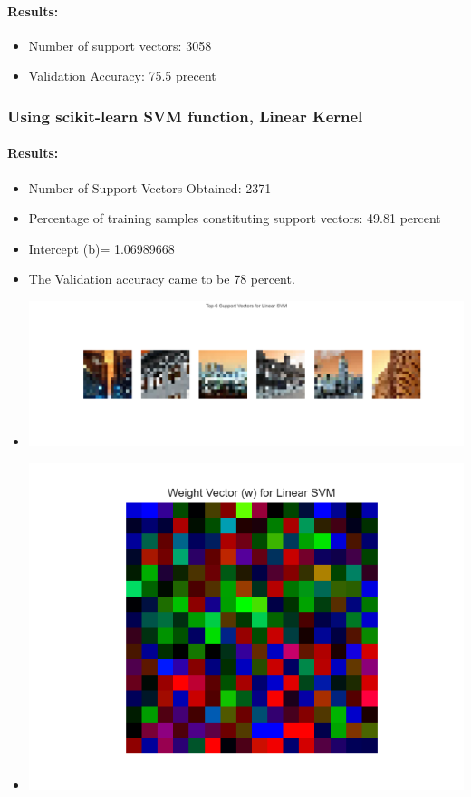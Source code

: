 \documentclass[12pt,a4paper]{article}
\begin{document}
\paragraph{Results:}

\begin{itemize}
    \item Number of support vectors: 3058
    \item Validation Accuracy: 75.5 precent
\end{itemize}



\subsubsection{Using scikit-learn SVM function, Linear Kernel}

\paragraph{Results:}
\begin{itemize}
    \item Number of Support Vectors Obtained: 2371
    \item Percentage of training samples constituting support vectors: 49.81 percent
    \item Intercept (b)= 1.06989668
    \item The Validation accuracy came to be 78 percent.
    \item \includegraphics[width=\textwidth]{Assignment 2/q2/top_6_support_vectors_linear libsvm linear.png}
    \item \includegraphics[width=\textwidth]{Assignment 2/q2/weight_vector_linear libsvm linear.png}
\end{itemize}
\end{document}
